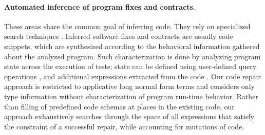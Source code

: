 \paragraph{{\bf Automated inference of program fixes and contracts.}}
These areas share the common goal of inferring code. They rely on specialized
search techniques
\cite{WeiETAL11InferringBetterContracts,PeiETAL11CodebasedAutomatedProgramFixing}.
Inferred software fixes and contracts are usually code snippets, which are
synthesized according to the behavioral information gathered about the analyzed program.
Such characterization is done by analyzing program state across the execution of
tests;
state can be defined using user-defined query operations
\cite{WeiETAL10AutomatedFixingProgramsContracts,WeiETAL11InferringBetterContracts}, and additional expressions extracted from
the code \cite{PeiETAL11CodebasedAutomatedProgramFixing}.
Our code repair approach is restricted to applicative long normal form terms and
considers only type information without characterization of program run-time
behavior.
Rather than filling of predefined code schemas at places in the existing code,
our approach exhaustively searches through the space of all expressions that
satisfy the constraint of a successful repair, while accounting for mutations of
 code.

\vspace{-0.5em}
